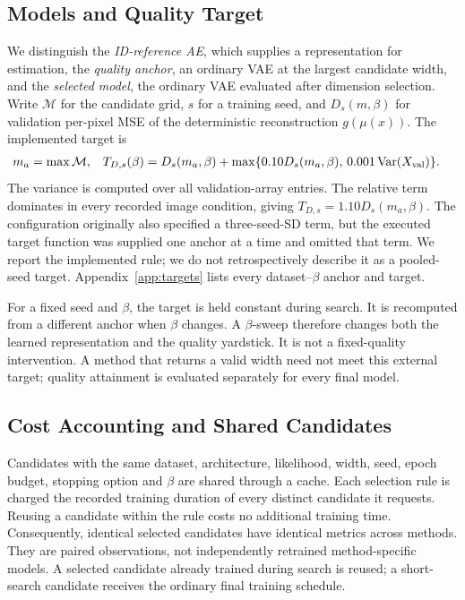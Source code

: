 \subsection{Models and Quality Target}\label{sec:quality}
We distinguish the \emph{ID-reference AE}, which supplies a representation
for estimation, the \emph{quality anchor}, an ordinary VAE at the largest
candidate width, and the \emph{selected model}, the ordinary VAE evaluated
after dimension selection. Write $\mathcal M$ for the candidate grid,
$s$ for a training seed, and $D_s(m,\beta)$ for validation per-pixel MSE
of the deterministic reconstruction $g(\mu(x))$. The implemented target is
\begin{align}
 m_a&=\max\mathcal M, &
 T_{D,s}(\beta)&=D_s(m_a,\beta)
 +\max\{0.10D_s(m_a,\beta),\,0.001\operatorname{Var}(X_{\rm val})\}.
 \label{eq:target}
\end{align}
The variance is computed over all validation-array entries. The relative
term dominates in every recorded image condition, giving
$T_{D,s}=1.10D_s(m_a,\beta)$. The configuration originally also specified a
three-seed-SD term, but the executed target function was supplied one
anchor at a time and omitted that term. We report the implemented rule;
we do not retrospectively describe it as a pooled-seed target.
Appendix~\ref{app:targets} lists every dataset--$\beta$ anchor and target.

For a fixed seed and $\beta$, the target is held constant during search.
It is recomputed from a different anchor when $\beta$ changes. A
$\beta$-sweep therefore changes both the learned representation and the
quality yardstick. It is not a fixed-quality intervention. A method that
returns a valid width need not meet this external target; quality
attainment is evaluated separately for every final model.

\subsection{Cost Accounting and Shared Candidates}\label{sec:cost}
Candidates with the same dataset, architecture, likelihood, width, seed,
epoch budget, stopping option and $\beta$ are shared through a cache.
Each selection rule is charged the recorded training duration of every
distinct candidate it requests. Reusing a candidate within the rule costs
no additional training time. Consequently, identical selected candidates
have identical metrics across methods. They are paired observations, not
independently retrained method-specific models. A selected candidate
already trained during search is reused; a short-search candidate receives
the ordinary final training schedule.

